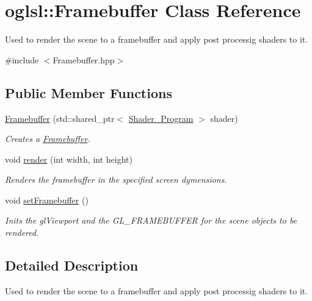 \hypertarget{classoglsl_1_1_framebuffer}{}\section{oglsl\+:\+:Framebuffer Class Reference}
\label{classoglsl_1_1_framebuffer}


Used to render the scene to a framebuffer and apply post processig shaders to it.  




{\ttfamily \#include $<$Framebuffer.\+hpp$>$}

\subsection*{Public Member Functions}
\begin{DoxyCompactItemize}
\item 
\mbox{\hyperlink{classoglsl_1_1_framebuffer_a69506454416fe0134814dade467e147e}{Framebuffer}} (std\+::shared\+\_\+ptr$<$ \mbox{\hyperlink{classoglsl_1_1_shader___program}{Shader\+\_\+\+Program}} $>$ shader)
\begin{DoxyCompactList}\small\item\em Creates a \mbox{\hyperlink{classoglsl_1_1_framebuffer}{Framebuffer}}. \end{DoxyCompactList}\item 
void \mbox{\hyperlink{classoglsl_1_1_framebuffer_a628dd0fb23006b139c75786a3d7da1a6}{render}} (int width, int height)
\begin{DoxyCompactList}\small\item\em Renders the framebuffer in the specified screen dymensions. \end{DoxyCompactList}\item 
void \mbox{\hyperlink{classoglsl_1_1_framebuffer_a3e0f4248aed96f483a318b34ea8c9cb8}{set\+Framebuffer}} ()
\begin{DoxyCompactList}\small\item\em Inits the gl\+Viewport and the G\+L\+\_\+\+F\+R\+A\+M\+E\+B\+U\+F\+F\+ER for the scene objects to be rendered. \end{DoxyCompactList}\end{DoxyCompactItemize}


\subsection{Detailed Description}
Used to render the scene to a framebuffer and apply post processig shaders to it. 

